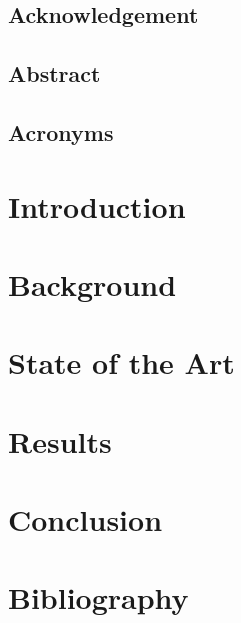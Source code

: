 \documentclass[openany,12pt,oneside]{extreport}
\begin{document}



\chapter*{Acknowledgement}


\chapter*{Abstract}


\chapter*{Acronyms}


\clearpage
\tableofcontents
\listoffigures
\listoftables

\clearpage
{}
\setcounter{part}{0}

\part{Introduction}


\part{Background}


\part{State of the Art}




\part{Results}


\part{Conclusion}


\part{Bibliography}
\printbibliography
\end{document}
